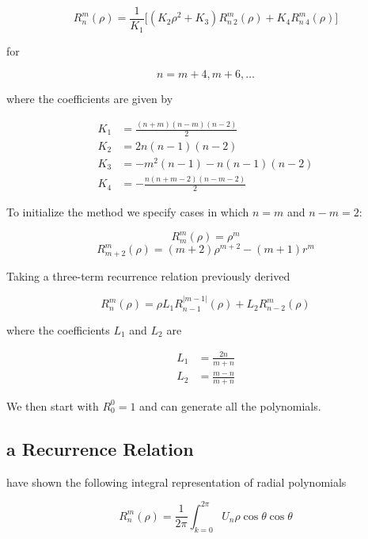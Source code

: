 \documentclass{tufte-handout}
\begin{document}
\begin{equation}
R_n^m(\rho)=\frac{1}{K_1}\Big[(K_2\rho^2+K_3)R_{n\ 2}^m (\rho)+K_4R_{n\
4}^m(\rho)\Big]
\end{equation}

for

$$n=m+4,m+6, \dots$$

where the coefficients are given by\cite{janssen2007computing}

\begin{align*}
K_1&=\frac{(n+m)(n-m)(n-2)}{2}\\
K_2&=2n(n-1)(n-2)\\
K_3&=-m^2(n-1)-n(n-1)(n-2)\\
K_4&=-\frac{n(n+m-2)(n-m-2)}{2}
\end{align*}

To initialize the method we specify cases in which $n=m$ and $n-m=2$:\cite{chong2003comparative}

\begin{equation}
R_m^m(\rho)=\rho^m
\end{equation}
\begin{equation}
R_{m+2}^m(\rho)=(m+2)\rho^{m+2}-(m+1)r^m
\end{equation}

Taking a three-term recurrence relation previously derived\cite{prata1989algorithm}

\begin{equation}
R_n^m(\rho)=\rho L_1R_{n-1}^{|m-1|}(\rho)+L_2R_{n-2}^m(\rho)
\end{equation}

where the coefficients $L_1$ and $L_2$ are

\begin{align*}
L_1&=\frac{2n}{m+n}\\
L_2&=\frac{m-n}{m+n}
\end{align*}

We then start with $R_0^0=1$ and can generate all the polynomials.

\subsection{a Recurrence Relation}\label{sec:relation}

 have shown the following integral representation of radial polynomials\cite{janssen2007computing}

\begin{equation}
R_n^m(\rho)=\frac{1}{2\pi}\int_{k=0}^{2\pi}U_n \rho\cos\theta\cos \theta
\end{equation}
\end{document}
